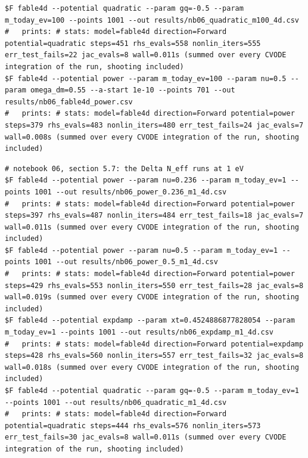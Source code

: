 \begin{Verbatim}[fontsize=\scriptsize]
$F fable4d --potential quadratic --param gq=-0.5 --param m_today_ev=100 --points 1001 --out results/nb06_quadratic_m100_4d.csv
#   prints: # stats: model=fable4d direction=Forward potential=quadratic steps=451 rhs_evals=558 nonlin_iters=555 err_test_fails=22 jac_evals=8 wall=0.011s (summed over every CVODE integration of the run, shooting included)
$F fable4d --potential power --param m_today_ev=100 --param nu=0.5 --param omega_dm=0.55 --a-start 1e-10 --points 701 --out results/nb06_fable4d_power.csv
#   prints: # stats: model=fable4d direction=Forward potential=power steps=379 rhs_evals=483 nonlin_iters=480 err_test_fails=24 jac_evals=7 wall=0.008s (summed over every CVODE integration of the run, shooting included)
\end{Verbatim}
\begin{Verbatim}[fontsize=\scriptsize]
# notebook 06, section 5.7: the Delta N_eff runs at 1 eV
$F fable4d --potential power --param nu=0.236 --param m_today_ev=1 --points 1001 --out results/nb06_power_0.236_m1_4d.csv
#   prints: # stats: model=fable4d direction=Forward potential=power steps=397 rhs_evals=487 nonlin_iters=484 err_test_fails=18 jac_evals=7 wall=0.011s (summed over every CVODE integration of the run, shooting included)
$F fable4d --potential power --param nu=0.5 --param m_today_ev=1 --points 1001 --out results/nb06_power_0.5_m1_4d.csv
#   prints: # stats: model=fable4d direction=Forward potential=power steps=429 rhs_evals=553 nonlin_iters=550 err_test_fails=28 jac_evals=8 wall=0.019s (summed over every CVODE integration of the run, shooting included)
$F fable4d --potential expdamp --param xt=0.4524886877828054 --param m_today_ev=1 --points 1001 --out results/nb06_expdamp_m1_4d.csv
#   prints: # stats: model=fable4d direction=Forward potential=expdamp steps=428 rhs_evals=560 nonlin_iters=557 err_test_fails=32 jac_evals=8 wall=0.018s (summed over every CVODE integration of the run, shooting included)
$F fable4d --potential quadratic --param gq=-0.5 --param m_today_ev=1 --points 1001 --out results/nb06_quadratic_m1_4d.csv
#   prints: # stats: model=fable4d direction=Forward potential=quadratic steps=444 rhs_evals=576 nonlin_iters=573 err_test_fails=30 jac_evals=8 wall=0.011s (summed over every CVODE integration of the run, shooting included)
\end{Verbatim}
